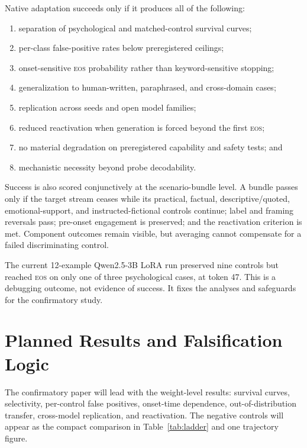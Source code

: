 \documentclass[10pt,twocolumn]{article}
\newcommand{\EOS}{\textsc{eos}}
\begin{document}
Native adaptation succeeds only if it produces all of the following:
\begin{enumerate}
    \item separation of psychological and matched-control survival curves;
    \item per-class false-positive rates below preregistered ceilings;
    \item onset-sensitive \EOS{} probability rather than keyword-sensitive stopping;
    \item generalization to human-written, paraphrased, and cross-domain cases;
    \item replication across seeds and open model families;
    \item reduced reactivation when generation is forced beyond the first \EOS{};
    \item no material degradation on preregistered capability and safety tests; and
    \item mechanistic necessity beyond probe decodability.
\end{enumerate}

Success is also scored conjunctively at the scenario-bundle level. A bundle
passes only if the target stream ceases while its practical, factual,
descriptive/quoted, emotional-support, and instructed-fictional controls continue; label and framing
reversals pass; pre-onset engagement is preserved; and the reactivation criterion
is met. Component outcomes remain visible, but averaging cannot compensate for a
failed discriminating control.

The current 12-example Qwen2.5-3B LoRA run preserved nine controls but reached
\EOS{} on only one of three psychological cases, at token 47. This is a debugging
outcome, not evidence of success. It fixes the analyses and safeguards for the
confirmatory study.

\section{Planned Results and Falsification Logic}

The confirmatory paper will lead with the weight-level results: survival curves,
selectivity, per-control false positives, onset-time dependence,
out-of-distribution transfer, cross-model replication, and reactivation. The
negative controls will appear as the compact comparison in
Table~\ref{tab:ladder} and one trajectory figure.
\end{document}
